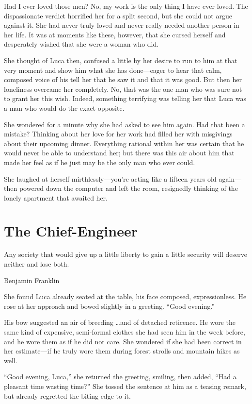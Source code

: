 Had I ever loved those men? No, my work is the only thing I have ever loved. The dispassionate verdict horrified her for a split second, but she could not argue against it. She had never truly loved and never really needed another person in her life. It was at moments like these, however, that she cursed herself and desperately wished that she were a woman who did.

She thought of Luca then, confused a little by her desire to run to him at that very moment and show him what she has done---eager to hear that calm, composed voice of his tell her that he saw it and that it was good. But then her loneliness overcame her completely. No, that was the one man who was sure not to grant her this wish. Indeed, something terrifying was telling her that Luca was a man who would do the exact opposite.

She wondered for a minute why she had asked to see him again. Had that been a mistake? Thinking about her love for her work had filled her with misgivings about their upcoming dinner. Everything rational within her was certain that he would never be able to understand her; but there was this air about him that made her feel as if he just may be the only man who ever could.

She laughed at herself mirthlessly---you're acting like a fifteen years old again---then powered down the computer and left the room, resignedly thinking of the lonely apartment that awaited her.

\chapter{The Chief-Engineer}

\epigraph{Any society that would give up a little liberty to gain a little security will deserve neither and lose both.}{Benjamin Franklin}

\firstparagraph

She found Luca already seated at the table, his face composed, expressionless. He rose at her approach and bowed slightly in a greeting. ``Good evening.''

His bow suggested an air of breeding \ldots and of detached reticence. He wore the same kind of expensive, semi-formal clothes she had seen him in the week before, and he wore them as if he did not care. She wondered if she had been correct in her estimate---if he truly wore them during forest strolls and mountain hikes as well.

``Good evening, Luca,'' she returned the greeting, smiling, then added, ``Had a pleasant time wasting time?'' She tossed the sentence at him as a teasing remark, but already regretted the biting edge to it.

